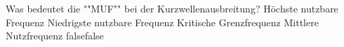     {Was bedeutet die ""MUF"" bei der Kurzwellenausbreitung?}
    {Höchste nutzbare Frequenz}
    {Niedrigste nutzbare Frequenz}
    {Kritische Grenzfrequenz}
    {Mittlere Nutzfrequenz}
    {false}{false}